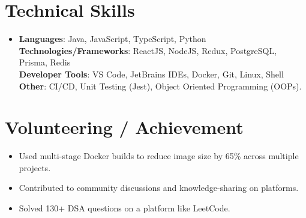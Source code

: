 \documentclass[letterpaper,11pt]{article}
\newcommand{\resumeItem}[1]{
  \item\small{
    {#1 \vspace{-2pt}}
  }
}
\newcommand{\resumeItemListStart}{\begin{itemize}}
\newcommand{\resumeItemListEnd}{\end{itemize}\vspace{-5pt}}
\begin{document}
%
\section{Technical Skills}
 \vspace{5pt}
 \begin{itemize}[leftmargin=0.15in, label={}]
    \item{
     \textbf{Languages}{: Java, JavaScript, TypeScript, Python} \\
     \vspace{4pt}
     \textbf{Technologies/Frameworks}{: ReactJS, NodeJS, Redux, PostgreSQL, Prisma, Redis} \\
     \vspace{4pt}
     \textbf{Developer Tools}{: VS Code, JetBrains IDEs, Docker, Git, Linux, Shell} \\
     \vspace{4pt}
     \textbf{Other}{: CI/CD, Unit Testing (Jest), Object Oriented Programming (OOPs).} \\
    }
 \end{itemize}
 \vspace{-10pt}



\section{Volunteering / Achievement}
 \vspace{5pt}
    \resumeItemListStart
        \resumeItem{Used multi-stage Docker builds to reduce image size by 65\% across multiple projects.}
        \resumeItem{Contributed to community discussions and knowledge-sharing on platforms.}
        \resumeItem{Solved 130+ DSA questions on a platform like LeetCode.}

        


    \resumeItemListEnd


            
\end{document}
